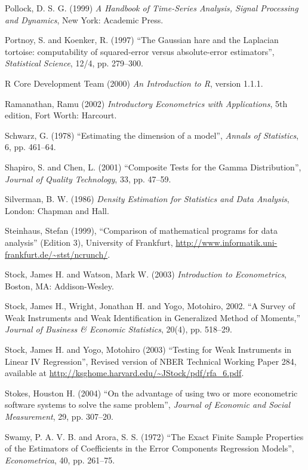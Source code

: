 \begin{thebibliography}
  Pollock, D. S. G. (1999) \emph{A Handbook of Time-Series Analysis,
    Signal Processing and Dynamics}, New York: Academic Press.

  Portnoy, S. and Koenker, R. (1997) ``The Gaussian hare and the
  Laplacian tortoise: computability of squared-error versus
  absolute-error estimators'', \emph{Statistical Science}, 12/4,
  pp. 279--300.
  
  R Core Development Team (2000) \emph{An Introduction to R}, version
  1.1.1.

  Ramanathan, Ramu (2002) \emph{Introductory Econometrics with
    Applications}, 5th edition, Fort Worth: Harcourt.
  
  Schwarz, G. (1978) ``Estimating the dimension of a model'',
  \textit{Annals of Statistics}, 6, pp. 461--64.
  
  Shapiro, S. and Chen, L. (2001) ``Composite Tests for the Gamma
  Distribution'', \emph{Journal of Quality Technology}, 33, pp.
  47--59.
    
  Silverman, B. W. (1986) \emph{Density Estimation for Statistics and
    Data Analysis}, London: Chapman and Hall.

  Steinhaus, Stefan (1999), ``Comparison of mathematical programs for
  data analysis'' (Edition 3), University of Frankfurt, 
  \url{http://www.informatik.uni-frankfurt.de/~stst/ncrunch/}.
  
  Stock, James H. and Watson, Mark W. (2003) \emph{Introduction to
    Econometrics}, Boston, MA: Addison-Wesley.

  Stock, James H., Wright, Jonathan H. and Yogo, Motohiro, 2002. ``A
  Survey of Weak Instruments and Weak Identification in Generalized
  Method of Moments,'' \emph{Journal of Business \& Economic
    Statistics}, 20(4), pp. 518--29.

  Stock, James H. and Yogo, Motohiro (2003) ``Testing for Weak
  Instruments in Linear IV Regression'', Revised version of 
  NBER Technical Working Paper 284, available at
  \url{http://ksghome.harvard.edu/~JStock/pdf/rfa_6.pdf}.

  Stokes, Houston H. (2004) ``On the advantage of using two or more
  econometric software systems to solve the same problem'',
  \emph{Journal of Economic and Social Measurement}, 29, pp. 307--20.

  Swamy, P. A. V. B. and Arora, S. S. (1972) ``The Exact Finite Sample
  Properties of the Estimators of Coefficients in the Error Components
  Regression Models'', \emph{Econometrica}, 40, pp. 261--75.  


\end{thebibliography}
